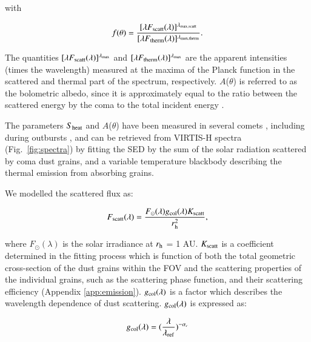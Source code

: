 \documentclass[a4paper,fleqn,usenatbib]{mnras}
\begin{document}
\noindent
with

\begin{equation}\label{eq:2b}
f(\theta) = \frac{[\lambda F_{\rm scatt}(\lambda)]^{\lambda_{\rm
max, scatt}}}{[\lambda F_{\rm therm}(\lambda)]^{\lambda_{\rm max,
therm}}}.
\end{equation}


The quantities $[\lambda F_{\rm scatt}(\lambda)]^{\lambda_{\rm max}}$ and $[\lambda F_{\rm therm}(\lambda)]^{\lambda_{\rm max}}$ are the apparent intensities (times the wavelength) measured at the maxima of the Planck function in the scattered and thermal part of the spectrum, respectively. $A$($\theta$) is referred to as the bolometric albedo, since it is approximately equal to the ratio between the scattered energy by the coma to the total incident energy \citep{Woodward2015}.

The parameters $S_{\rm heat}$ and $A$($\theta$) have been measured in several comets \citep[e.g.,][]{Mason2001},  including during outbursts \citep{Yang2009}, and can be retrieved from VIRTIS-H spectra (Fig.~\ref{fig:spectra}) by fitting the SED by the sum of the solar radiation scattered by coma dust grains, and a variable temperature blackbody describing the thermal emission from absorbing grains.

We modelled the scattered flux as:

\begin{equation}
F_{\rm scatt}(\lambda) = \frac{F_{\odot}(\lambda) g_{\rm
col}(\lambda) K_{\rm scatt}}{r_{\rm h}^2},
\end{equation}

\noindent where $F_{\odot}(\lambda)$ is the solar irradiance at
$r_{\rm h}$ = 1 AU.  $K_{\rm scatt}$ is a coefficient determined
in the fitting process which is function of both the total
geometric cross-section of the dust grains within the FOV and the
scattering properties of the individual grains, such as the
scattering phase function, and their scattering efficiency (Appendix
\ref{app:emission}). $g_{\rm col}(\lambda)$ is a factor which
describes the wavelength dependence of dust scattering. $g_{\rm
col}(\lambda)$ is expressed as:


\begin{equation}
g_{\rm col}(\lambda) = (\frac{\lambda}{\lambda_{\rm
ref}})^{-\alpha_c}
\end{equation}
\end{document}
